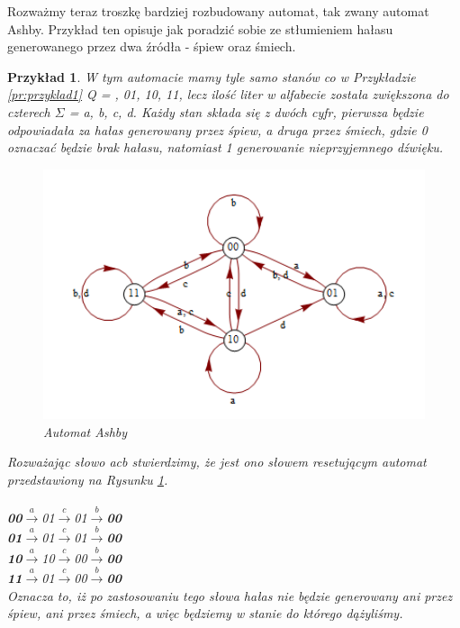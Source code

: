 \documentclass[12pt,a4paper]{article}
\newtheorem{pr}{Przyk{\l}ad}[section]
\begin{document}
Rozwa\.{z}my teraz troszk\k{e} bardziej rozbudowany automat, tak zwany automat Ashby. Przyk{\l}ad ten opisuje jak poradzi\'{c} sobie ze st{\l}umieniem ha{\l}asu generowanego przez dwa \'{z}r\'{o}d{\l}a - \'{s}piew oraz \'{s}miech.

\begin{pr}
W tym automacie mamy tyle samo stan\'{o}w co w Przyk{\l}adzie \ref{pr:przyklad1}  Q = , 01, 10, 11\textbraceright, lecz ilo\'{s}\'{c} liter w alfabecie zosta{\l}a zwi\k{e}kszona do czterech $\Sigma$ = \textbraceleft a, b, c, d\textbraceright. Ka\.{z}dy stan sk{\l}ada si\k{e} z dw\'{o}ch cyfr, pierwsza b\k{e}dzie odpowiada{\l}a za ha{\l}as generowany przez \'{s}piew, a druga przez \'{s}miech, gdzie \textit{0} oznacza\'{c} b\k{e}dzie brak ha{\l}asu, natomiast \textit{1} generowanie nieprzyjemnego d\'{z}wi\k{e}ku.

\begin{figure}[H]
    \centering
    \includegraphics[width=1.05\textwidth]{rysunek2}
    \caption{Automat Ashby}
    \label{fig:rysunek2}
\end{figure}

Rozwa\.{z}aj\k{a}c s{\l}owo \textit{acb} stwierdzimy, \.{z}e jest ono s{\l}owem resetuj\k{a}cym automat przedstawiony na Rysunku \ref{fig:rysunek2}.\\
\\
\textbf{00}$\xrightarrow{a}$01$\xrightarrow{c}$01$\xrightarrow{b}$\textbf{00}\\
\textbf{01}$\xrightarrow{a}$01$\xrightarrow{c}$01$\xrightarrow{b}$\textbf{00}\\
\textbf{10}$\xrightarrow{a}$10$\xrightarrow{c}$00$\xrightarrow{b}$\textbf{00}\\
\textbf{11}$\xrightarrow{a}$01$\xrightarrow{c}$00$\xrightarrow{b}$\textbf{00}\\

Oznacza to, i\.{z} po zastosowaniu tego s{\l}owa ha{\l}as nie b\k{e}dzie generowany ani przez \'{s}piew, ani przez \'{s}miech, a wi\k{e}c b\k{e}dziemy w stanie do kt\'{o}rego d\k{a}\.{z}yli\'{s}my.
\end{pr}
\end{document}
